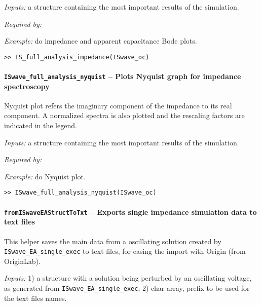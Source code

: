 \textit{Inputs:} a structure containing the most important results of the simulation.



\textit{Required by:} 

\textit{Example:} do impedance and apparent capacitance Bode plots.
\begin{lstlisting}[style=Matlab-editor]
>> IS_full_analysis_impedance(ISwave_oc)
\end{lstlisting}

\paragraph{\texttt{ISwave\_full\_analysis\_nyquist} -- Plots Nyquist graph for impedance spectroscopy}
Nyquist plot refers the imaginary component of the impedance to its real component.
A normalized spectra is also plotted and the rescaling factors are indicated in the legend.

\textit{Inputs:} a structure containing the most important results of the simulation.



\textit{Required by:} 

\textit{Example:} do Nyquist plot.
\begin{lstlisting}[style=Matlab-editor]
>> ISwave_full_analysis_nyquist(ISwave_oc)
\end{lstlisting}

		

				
\paragraph{\texttt{from\-ISwaveEA\-Struct\-ToTxt} -- Exports single impedance simulation data to text files}
This helper saves the main data from a oscillating solution created by \texttt{ISwave\_EA\_single\_exec} to text files, for easing the import with Origin (from OriginLab).

\textit{Inputs:} 1) a structure with a solution being perturbed by an oscillating voltage, as generated from \texttt{ISwave\_EA\_single\_exec};
2) char array, prefix to be used for the text files names.




